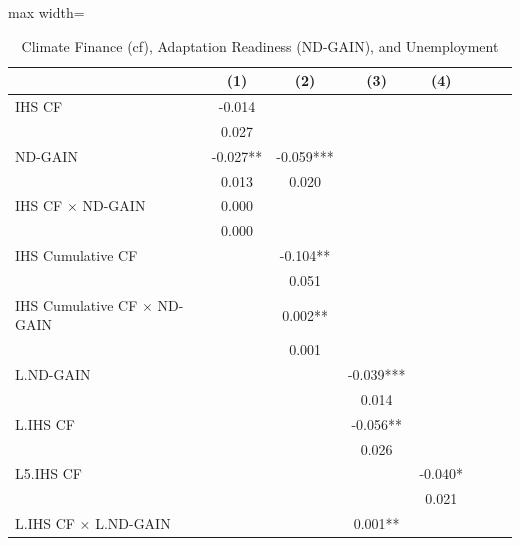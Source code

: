 \begin{table}[htbp]\centering \caption{Climate Finance (cf), Adaptation Readiness (ND-GAIN), and Unemployment} \begin{adjustbox}{max width=\textwidth} \begin{tabular}{l*{7}{c}} \toprule
                    &\multicolumn{1}{c}{(1)}   &\multicolumn{1}{c}{(2)}   &\multicolumn{1}{c}{(3)}   &\multicolumn{1}{c}{(4)}   \\
\midrule
IHS CF              &      -0.014   &               &               &               \\
                    &       0.027   &               &               &               \\
ND-GAIN             &      -0.027** &      -0.059***&               &               \\
                    &       0.013   &       0.020   &               &               \\
IHS CF $\times$ ND-GAIN&       0.000   &               &               &               \\
                    &       0.000   &               &               &               \\
IHS Cumulative CF   &               &      -0.104** &               &               \\
                    &               &       0.051   &               &               \\
IHS Cumulative CF $\times$ ND-GAIN&               &       0.002** &               &               \\
                    &               &       0.001   &               &               \\
L.ND-GAIN           &               &               &      -0.039***&               \\
                    &               &               &       0.014   &               \\
L.IHS CF            &               &               &      -0.056** &               \\
                    &               &               &       0.026   &               \\
L5.IHS CF           &               &               &               &      -0.040*  \\
                    &               &               &               &       0.021   \\
L.IHS CF $\times$ L.ND-GAIN&               &               &       0.001** &               \\

\end{tabular}
\end{adjustbox}
\end{table}
